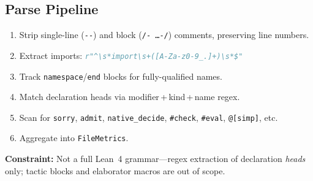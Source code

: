 \subsection{Parse Pipeline}

\begin{enumerate}
  \item Strip single-line (\texttt{-{}-}) and block (\texttt{/- \ldots -/})
        comments, preserving line numbers.
  \item Extract imports: \lstinline[language=Python]{r"^\s*import\s+([A-Za-z0-9_.]+)\s*$"}
  \item Track \texttt{namespace}/\texttt{end} blocks for fully-qualified names.
  \item Match declaration heads via modifier\,+\,kind\,+\,name regex.
  \item Scan for \texttt{sorry}, \texttt{admit}, \texttt{native\_decide},
        \texttt{\#check}, \texttt{\#eval}, \texttt{@[simp]}, etc.
  \item Aggregate into \texttt{FileMetrics}.
\end{enumerate}

\noindent\textbf{Constraint:} Not a full Lean~4 grammar---regex extraction of
declaration \emph{heads} only; tactic blocks and elaborator macros are out of
scope.
